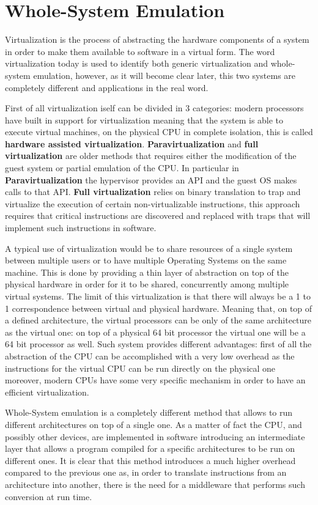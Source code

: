 \chapter{Whole-System Emulation}
\label{chap:3}

Virtualization is the process of abstracting the hardware components of a system in order to make them available to software in a virtual form.
The word virtualization today is used to identify both generic virtualization and whole-system emulation, however, as it will become clear later, this two systems are completely different and applications in the real word.

First of all virtualization iself can be divided in 3 categories: modern processors have built in support for virtualization meaning that the system is able to execute virtual machines, on the physical CPU in complete isolation, this is called \textbf{hardware assisted virtualization}. \textbf{Paravirtualization} and \textbf{full virtualization} are older methods that requires either the modification of the guest system or partial emulation of the CPU. In particular in \textbf{Paravirtualization} the hypervisor provides an API and the guest OS makes calls to that API. \textbf{Full virtualization} relies on binary translation to trap and virtualize the execution of certain non-virtualizable instructions, this approach requires that critical instructions are discovered and replaced with traps that will implement such instructions in software.

A typical use of virtualization would be to share resources of a single system between multiple users or to have multiple Operating Systems on the same machine. This is done by providing a thin layer of abstraction on top of the physical hardware in order for it to be shared, concurrently among multiple virtual systems. The limit of this virtualization is that there will always be a 1 to 1 correspondence between virtual and physical hardware. Meaning that, on top of a defined architecture, the virtual processors can be only of the same architecture as the virtual one: on top of a physical 64 bit processor the virtual one will be a 64 bit processor as well. Such system provides different advantages: first of all the abstraction of the CPU can be accomplished with a very low overhead as the instructions for the virtual CPU can be run directly on the physical one moreover, modern CPUs have some very specific mechanism in order to have an efficient virtualization.

Whole-System emulation is a completely different method that allows to run different architectures on top of a single one. As a matter of fact the CPU, and possibly other devices, are implemented in software introducing an intermediate layer that allows a program compiled for a specific architectures to be run on different ones. It is clear that this method introduces a much higher overhead compared to the previous one as, in order to translate instructions from an architecture into another, there is the need for a middleware that performs such conversion at run time.

